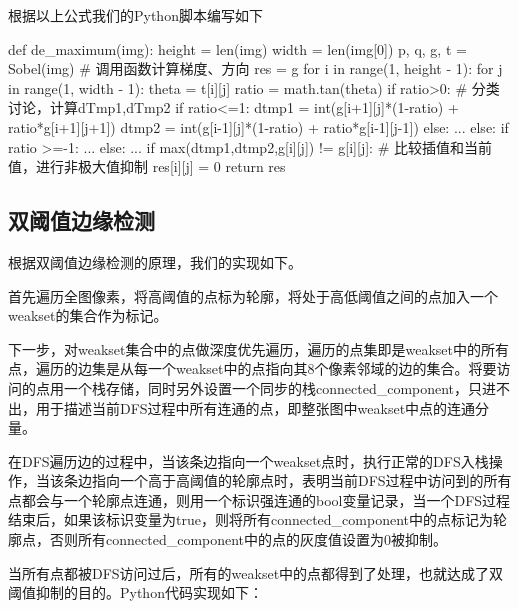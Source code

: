 \documentclass{article}
\begin{document}
根据以上公式我们的Python脚本编写如下
\begin{python}
def de_maximum(img):
    height = len(img)
    width = len(img[0])
    p, q, g, t = Sobel(img)                          # 调用函数计算梯度、方向
    res = g
    for i in range(1, height - 1):
        for j in range(1, width - 1):
            theta = t[i][j]
            ratio = math.tan(theta)
            if ratio>0:                              # 分类讨论，计算dTmp1,dTmp2
                if ratio<=1:
                    dtmp1 = int(g[i+1][j]*(1-ratio) + ratio*g[i+1][j+1])
                    dtmp2 = int(g[i-1][j]*(1-ratio) + ratio*g[i-1][j-1])
                else: ...
            else:
                if ratio >=-1:  ...
                else:  ...
            if max(dtmp1,dtmp2,g[i][j]) != g[i][j]:  # 比较插值和当前值，进行非极大值抑制
                res[i][j] = 0
    return res
\end{python}


\subsection{双阈值边缘检测}

根据双阈值边缘检测的原理，我们的实现如下。

首先遍历全图像素，将高阈值的点标为轮廓，将处于高低阈值之间的点加入一个weakset的集合作为标记。

下一步，对weakset集合中的点做深度优先遍历，遍历的点集即是weakset中的所有点，遍历的边集是从每一个weakset中的点指向其8个像素邻域的边的集合。将要访问的点用一个栈存储，同时另外设置一个同步的栈connected\_component，只进不出，用于描述当前DFS过程中所有连通的点，即整张图中weakset中点的连通分量。

在DFS遍历边的过程中，当该条边指向一个weakset点时，执行正常的DFS入栈操作，当该条边指向一个高于高阈值的轮廓点时，表明当前DFS过程中访问到的所有点都会与一个轮廓点连通，则用一个标识强连通的bool变量记录，当一个DFS过程结束后，如果该标识变量为true，则将所有connected\_component中的点标记为轮廓点，否则所有connected\_component中的点的灰度值设置为0被抑制。

当所有点都被DFS访问过后，所有的weakset中的点都得到了处理，也就达成了双阈值抑制的目的。Python代码实现如下：
\end{document}
